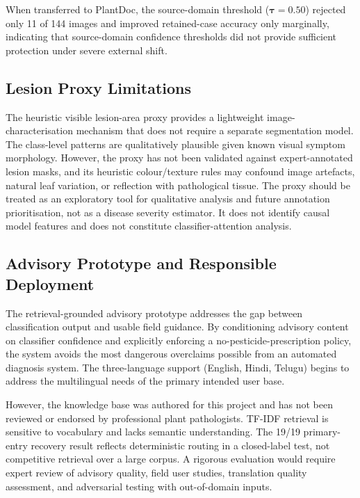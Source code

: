 \documentclass[conference]{IEEEtran}
\begin{document}
When transferred to PlantDoc, the source-domain threshold
($\bm{\tau}\!=\!0.50$) rejected only 11 of 144 images and improved
retained-case accuracy only marginally, indicating that source-domain
confidence thresholds did not provide sufficient protection under
severe external shift.

\subsection{Lesion Proxy Limitations}

The heuristic visible lesion-area proxy provides a lightweight
image-characterisation mechanism that does not require a separate
segmentation model. The class-level patterns are qualitatively
plausible given known visual symptom morphology. However, the proxy
has not been validated against expert-annotated lesion masks, and its
heuristic colour/texture rules may confound image artefacts, natural
leaf variation, or reflection with pathological tissue. The proxy
should be treated as an exploratory tool for qualitative analysis and
future annotation prioritisation, not as a disease severity estimator.
It does not identify causal model features and does not constitute
classifier-attention analysis.

\subsection{Advisory Prototype and Responsible Deployment}

The retrieval-grounded advisory prototype addresses the gap between
classification output and usable field guidance. By conditioning
advisory content on classifier confidence and explicitly enforcing a
no-pesticide-prescription policy, the system avoids the most dangerous
overclaims possible from an automated diagnosis system. The
three-language support (English, Hindi, Telugu) begins to address the
multilingual needs of the primary intended user base.

However, the knowledge base was authored for this project and has not
been reviewed or endorsed by professional plant pathologists. TF-IDF
retrieval is sensitive to vocabulary and lacks semantic understanding.
The 19/19 primary-entry recovery result reflects deterministic
routing in a closed-label test, not competitive retrieval over a
large corpus. A rigorous evaluation would require expert review of
advisory quality, field user studies, translation quality assessment,
and adversarial testing with out-of-domain inputs.
\end{document}
